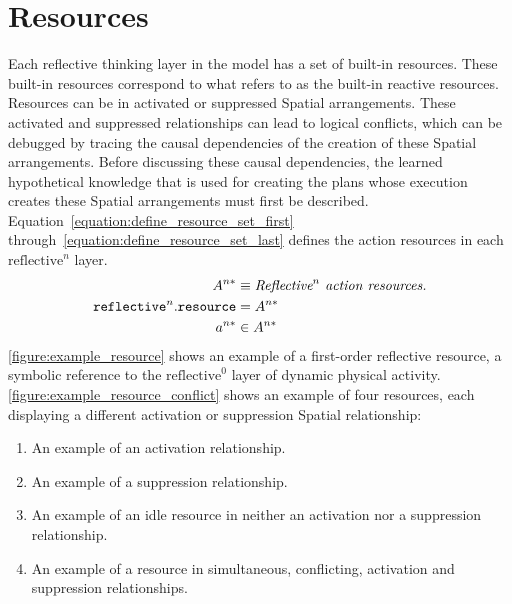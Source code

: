 \section{Resources}

Each reflective thinking layer in the model has a set of built-in
resources.  These built-in resources correspond to what
\cite{minsky:2006} refers to as the built-in reactive resources.
Resources can be in activated or suppressed Spatial arrangements.
These activated and suppressed relationships can lead to logical
conflicts, which can be debugged by tracing the causal dependencies of
the creation of these Spatial arrangements.  Before discussing these
causal dependencies, the learned hypothetical knowledge that is used
for creating the plans whose execution creates these Spatial
arrangements must first be described.
{\mbox{Equation~\ref{equation:define_resource_set_first}}}
{\mbox{through~\ref{equation:define_resource_set_last}}} defines the
action resources in each $\text{reflective}^n$ layer.
\begin{align}
\label{equation:define_resource_set_first}
                                       A^{n*} &\equiv \text{\emph{$\text{Reflective}^n$ action resources.}} \\
\text{\tt{reflective}}^n.\text{\tt{resource}} &= A^{n*} \\
\label{equation:define_resource_set_last}
                                       a^{n*} &\in A^{n*}
\end{align}
{\mbox{\autoref{figure:example_resource}}} shows an example of a
first-order reflective resource, a symbolic reference to the
$\text{reflective}^0$ layer of dynamic physical activity.
{\mbox{\autoref{figure:example_resource_conflict}}} shows an example
of four resources, each displaying a different activation or
suppression Spatial relationship:
\begin{enumerate}
\item An example of an activation relationship.
\item An example of a suppression relationship.
\item An example of an idle resource in neither an activation nor a
  suppression relationship.
\item An example of a resource in simultaneous, conflicting,
  activation and suppression relationships.
\end{enumerate}
